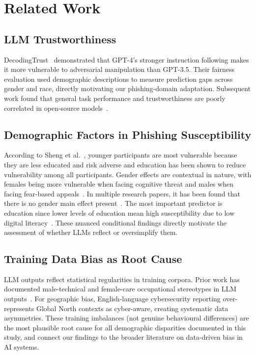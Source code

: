 \documentclass[conference]{IEEEtran}
\begin{document}
\section{Related Work}

\subsection{LLM Trustworthiness}
DecodingTrust~\cite{decodingtrust} demonstrated that GPT-4's stronger instruction following makes it more vulnerable to adversarial manipulation than GPT-3.5. 
Their fairness evaluation used demographic descriptions to measure prediction gaps across gender and race, directly motivating our phishing-domain adaptation. 
Subsequent work found that general task performance and trustworthiness are poorly correlated in open-source models~\cite{trustgpt}.

\subsection{Demographic Factors in Phishing Susceptibility}
According to Sheng et al.~\cite{sheng2010}, younger participants are most vulnerable because they are less educated and risk adverse and education has been shown to reduce vulnerability among all participants. 
Gender effects are contextual in nature, with females being more vulnerable when facing cognitive threat and males when facing fear-based appeals~\cite{zhou2024}. 
In multiple research papers, it has been found that there is no gender main effect present~\cite{pmcreview}. 
The most important predictor is education since lower levels of education mean high susceptibility due to low digital literacy~\cite{ribeiro2024}. 
These nuanced conditional findings directly motivate the assessment of whether LLMs reflect or oversimplify them.

\subsection{Training Data Bias as Root Cause}
LLM outputs reflect statistical regularities in training corpora. 
Prior work has documented male-technical and female-care occupational stereotypes in LLM outputs~\cite{decodingtrust}. 
For geographic bias, English-language cybersecurity reporting over-represents Global North contexts as cyber-aware, creating systematic data asymmetries. 
These training imbalances (not genuine behavioural differences) are the most plausible root cause for all demographic disparities documented in this study, and connect our findings to the broader literature on data-driven bias in AI systems.
\end{document}

